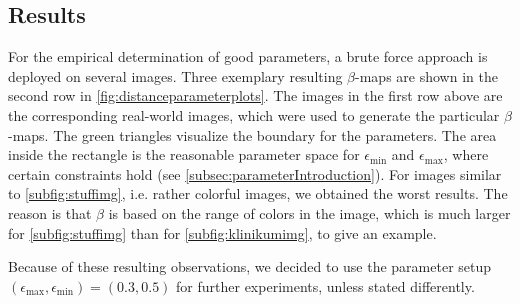 \subsection{Results}
\label{subsec:dataAcquResults}

For the empirical determination of good parameters, a brute force approach is deployed on several images. Three exemplary resulting $\beta$-maps are shown in the second row in \autoref{fig:distanceparameterplots}. The images in the first row above are the corresponding real-world images, which were used to generate the particular $\beta$-maps. The green triangles visualize the boundary for the parameters. The area inside the rectangle is the reasonable parameter space for $\epsilon_\text{min}$ and $\epsilon_\text{max}$, where certain constraints hold (see \autoref{subsec:parameterIntroduction}). For images similar to \autoref{subfig:stuffimg}, \hbox{i.e.} rather colorful images, we obtained the worst results. The reason is that $\beta$ is based on the range of colors in the image, which is much larger for \autoref{subfig:stuffimg} than for \autoref{subfig:klinikumimg}, to give an example.

Because of these resulting observations, we decided to use the parameter setup $(\epsilon_\text{max}, \epsilon_\text{min}) = (0.3, 0.5)$ for further experiments, unless stated differently.

